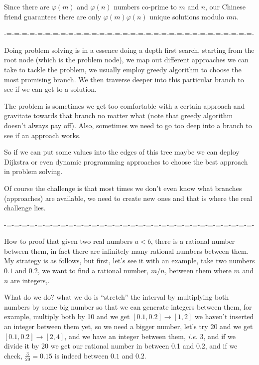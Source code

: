 \documentclass[aps,preprint,preprintnumbers,nofootinbib,showpacs,prd]{revtex4-1}
\newcommand{\ie}{{\it i.e.} }
\begin{document}
Since there are $\varphi(m)$ and $\varphi(n)$ numbers co-prime to $m$ and $n$, our Chinese friend guarantees there are only $\varphi(m)\varphi(n)$ unique solutions modulo $mn$.








-=-=-=-=-=-=-=-=-=-=-=-=-=-=-=-=-=-=-=-=-=-=-=-=-=-=-=-=-=-=-=-=-

Doing problem solving is in a essence doing a depth first search, starting from the root node (which is the problem node), we map out different approaches we can take to tackle the problem, we usually employ greedy algorithm to choose the most promising branch. We then traverse deeper into this particular branch to see if we can get to a solution.

The problem is sometimes we get too comfortable with a certain approach and gravitate towards that branch no matter what (note that greedy algorithm doesn't always pay off). Also, sometimes we need to go too deep into a branch to see if an approach works.

So if we can put some values into the edges of this tree maybe we can deploy Dijkstra or even dynamic programming approaches to choose the best approach in problem solving.

Of course the challenge is that most times we don't even know what branches (approaches) are available, we need to create new ones and that is where the real challenge lies.

-=-=-=-=-=-=-=-=-=-=-=-=-=-=-=-=-=-=-=-=-=-=-=-=-=-=-=-=-=-=-=-=-

How to proof that given two real numbers $a < b$, there is a rational number between them, in fact there are infinitely many rational numbers between them. My strategy is as follows, but first, let's see it with an example, take two numbers $0.1$ and $0.2$, we want to find a rational number, $m/n$, between them where $m$ and $n$ are integers,.

What do we do? what we do is ``stretch'' the interval by multiplying both numbers by some big number so that we can generate integers between them, for example, multiply both by 10 and we get $ [0.1, 0.2] \to [1, 2]$ we haven't inserted an integer between them yet, so we need a bigger number, let's try 20 and we get $ [0.1, 0.2] \to [2, 4]$, and we have an integer between them, \ie 3, and if we divide it by 20 we get our rational number in between 0.1 and 0.2, and if we check, $\frac{3}{20} = 0.15$ is indeed between $0.1$ and $0.2$.
\end{document}
